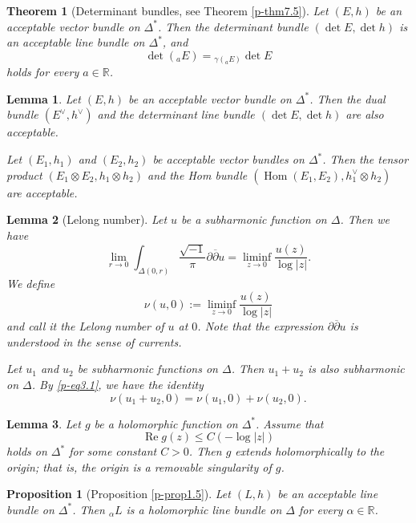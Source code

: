 \documentclass[10pt,a4paper]{amsart}
\newtheorem{prop}{Proposition}
\newtheorem{thm}{Theorem}
\newtheorem{lem}{Lemma}
\DeclareMathOperator{\Hom}{Hom}
\DeclareMathOperator{\re}{Re}
\begin{document}
\begin{thm}[Determinant bundles, see Theorem \ref{p-thm7.5}]\label{p-thm1.10}
Let $(E, h)$ be an acceptable vector bundle on $\Delta^*$. Then 
the determinant bundle $(\det E, \det h)$ is an acceptable 
line bundle on $\Delta^*$, and
\[
\det({}_a E) = {}_{\gamma({}_a E)} \det E
\]
holds for every $a \in \mathbb{R}$.
\end{thm}

\begin{lem}\label{p-lem2.2}
Let $(E, h)$ be an acceptable vector bundle on $\Delta^*$. 
Then the dual bundle $(E^\vee, h^\vee)$ and the 
determinant line bundle $(\det E, \det h)$ are also acceptable. 

Let $(E_1, h_1)$ and $(E_2, h_2)$ be acceptable 
vector bundles on $\Delta^*$. 
Then the tensor product $(E_1 \otimes E_2, h_1 \otimes h_2)$ 
and the Hom bundle $(\Hom(E_1, E_2), h_1^\vee \otimes h_2)$ are acceptable. 
\end{lem}

\begin{lem}[Lelong number]\label{p-lem3.1}
Let $u$ be a subharmonic function on $\Delta$. Then we have
\begin{equation}\label{p-eq3.1} 
\lim_{r \to 0} \int_{\Delta(0, r)} 
\frac{\sqrt{-1}}{\pi} \partial \overline{\partial} u 
= \liminf_{z \to 0} \frac{u(z)}{\log |z|}.
\end{equation}
We define
\[
\nu(u, 0) := \liminf_{z \to 0} \frac{u(z)}{\log |z|}
\]
and call it the {\em Lelong number} of $u$ at $0$. 
Note that the expression $\partial \overline{\partial} u$ is 
understood in the sense of currents.

Let $u_1$ and $u_2$ be subharmonic 
functions on $\Delta$. Then $u_1 + u_2$ is also subharmonic on $\Delta$.  
By \eqref{p-eq3.1}, we have the identity
\[
\nu(u_1 + u_2, 0) = \nu(u_1, 0) + \nu(u_2, 0).
\]
\end{lem}

\begin{lem}\label{p-lem3.3}
Let $g$ be a holomorphic function on $\Delta^*$. Assume that
\[
\re g(z) \leq C (-\log |z|)
\]
holds on $\Delta^*$ for some constant 
$C > 0$. Then $g$ extends holomorphically to 
the origin; that is, the origin is a removable singularity of $g$.
\end{lem}

\begin{prop}[Proposition \ref{p-prop1.5}]\label{p-prop4.1} 
Let $(L, h)$ be an acceptable line bundle 
on $\Delta^*$. 
Then ${}_\alpha L$ 
is a holomorphic line bundle 
on $\Delta$ for every $\alpha \in \mathbb R$. 
\end{prop}
\end{document}
